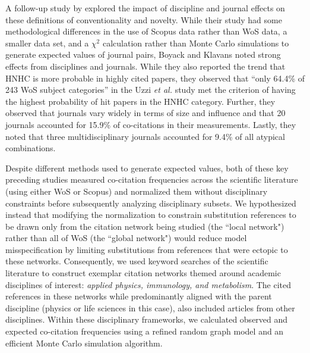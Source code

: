 \documentclass[NETN]{stjour}
\begin{document}
A follow-up study by \cite{boyack_vs_uzzi_2014} explored the impact of discipline and journal effects on these definitions of conventionality and novelty.  While their study had some methodological differences in the use of Scopus data rather than WoS data, a smaller data set, and a $\chi^2$ calculation rather than Monte Carlo simulations to generate expected values of journal pairs, Boyack and Klavans noted strong effects from disciplines and journals. While they also reported the trend that HNHC is more probable in highly cited papers, they observed that ``only 64.4\%  of  243  WoS  subject  categories'' in the Uzzi {\em et al.} study met the criterion of having the highest probability of hit papers in the HNHC category.  Further, they observed that journals vary widely in terms of size and influence and that 20 journals accounted for 15.9\% of co-citations in their measurements. Lastly, they noted that three multidisciplinary journals accounted for 9.4\% of all atypical combinations. 

Despite different methods used to generate expected values, both of these key preceding studies measured co-citation frequencies across the scientific literature (using either WoS or Scopus) and normalized them without disciplinary constraints before subsequently analyzing disciplinary subsets. We hypothesized instead that modifying the normalization to constrain substitution references to be drawn only from the citation network being studied (the ``local network") rather than all of WoS
(the ``global network") would reduce model misspecification by limiting substitutions from references that were ectopic to these networks. Consequently, we used keyword searches of the scientific literature to construct exemplar citation networks themed around academic disciplines of interest: \emph{applied physics, immunology, and metabolism}. The cited references in these networks while predominantly aligned with the parent discipline (physics or life sciences in this case), also included articles from other disciplines. Within these disciplinary frameworks, we calculated observed and expected co-citation frequencies using a refined random graph model and an efficient Monte Carlo simulation algorithm.
\end{document}
